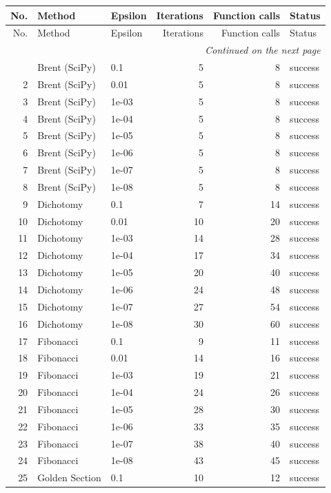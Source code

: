\begin{longtable}{rllrrl}
\toprule
No. & Method & Epsilon & Iterations & Function calls & Status \\
\midrule
\endfirsthead
\toprule
No. & Method & Epsilon & Iterations & Function calls & Status \\
\midrule
\endhead
\midrule
\multicolumn{6}{r}{\textit{Continued on the next page}} \\
\midrule
\endfoot
\bottomrule
\endlastfoot
1 & Brent (SciPy) & 0.1 & 5 & 8 & success \\
2 & Brent (SciPy) & 0.01 & 5 & 8 & success \\
3 & Brent (SciPy) & 1e-03 & 5 & 8 & success \\
4 & Brent (SciPy) & 1e-04 & 5 & 8 & success \\
5 & Brent (SciPy) & 1e-05 & 5 & 8 & success \\
6 & Brent (SciPy) & 1e-06 & 5 & 8 & success \\
7 & Brent (SciPy) & 1e-07 & 5 & 8 & success \\
8 & Brent (SciPy) & 1e-08 & 5 & 8 & success \\
9 & Dichotomy & 0.1 & 7 & 14 & success \\
10 & Dichotomy & 0.01 & 10 & 20 & success \\
11 & Dichotomy & 1e-03 & 14 & 28 & success \\
12 & Dichotomy & 1e-04 & 17 & 34 & success \\
13 & Dichotomy & 1e-05 & 20 & 40 & success \\
14 & Dichotomy & 1e-06 & 24 & 48 & success \\
15 & Dichotomy & 1e-07 & 27 & 54 & success \\
16 & Dichotomy & 1e-08 & 30 & 60 & success \\
17 & Fibonacci & 0.1 & 9 & 11 & success \\
18 & Fibonacci & 0.01 & 14 & 16 & success \\
19 & Fibonacci & 1e-03 & 19 & 21 & success \\
20 & Fibonacci & 1e-04 & 24 & 26 & success \\
21 & Fibonacci & 1e-05 & 28 & 30 & success \\
22 & Fibonacci & 1e-06 & 33 & 35 & success \\
23 & Fibonacci & 1e-07 & 38 & 40 & success \\
24 & Fibonacci & 1e-08 & 43 & 45 & success \\
25 & Golden Section & 0.1 & 10 & 12 & success \\

\end{longtable}
